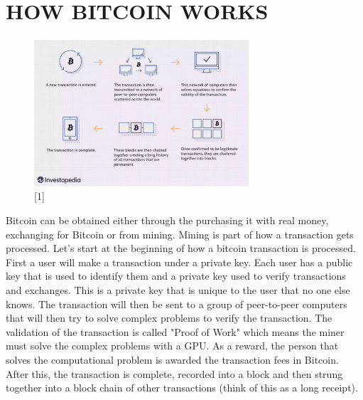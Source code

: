 \documentclass[letterpaper, 10 pt, conference]{ieeeconf}  %
\begin{document}
\section{HOW BITCOIN WORKS}
\begin{figure}[h!]
  \includegraphics[width=8cm]{process.PNG}
  \caption*{[1]}
\end{figure}
Bitcoin can be obtained either through the purchasing it with real money, exchanging for Bitcoin or from mining. Mining is part of how a transaction gets processed. Let's start at the beginning of how a bitcoin transaction is processed. First a user will make a transaction under a private key. Each user has a public key that is used to identify them and a private key used to verify transactions and exchanges. This is a private key that is unique to the user that no one else knows. The transaction will then be sent to a group of peer-to-peer computers that will then try to solve complex problems to verify the transaction. The validation of the transaction is called "Proof of Work" which means the miner must solve the complex problems with a GPU. As a reward, the person that solves the computational problem is awarded the transaction fees in Bitcoin. After this, the transaction is complete, recorded into a block and then strung together into a block chain of other transactions (think of this as a long receipt). 
\end{document}
